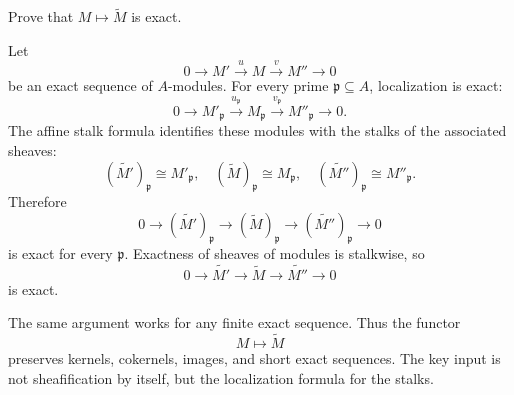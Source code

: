 \begin{problem}\label{prob:vi33-02}
Prove that \(M\mapsto\widetilde M\) is exact.
\end{problem}

\ifdefined\FullProblemDossiers
\begin{solution}
Let
\[
0\longrightarrow M'\xrightarrow{u}M\xrightarrow{v}M''\longrightarrow0
\]
be an exact sequence of \(A\)-modules.  For every prime \(\mathfrak p\subseteq A\), localization is exact:
\[
0\longrightarrow M'_{\mathfrak p}
\xrightarrow{u_{\mathfrak p}}
M_{\mathfrak p}
\xrightarrow{v_{\mathfrak p}}
M''_{\mathfrak p}
\longrightarrow0.
\]
The affine stalk formula identifies these modules with the stalks of the associated sheaves:
\[
(\widetilde{M'})_{\mathfrak p}\cong M'_{\mathfrak p},
\quad
(\widetilde M)_{\mathfrak p}\cong M_{\mathfrak p},
\quad
(\widetilde{M''})_{\mathfrak p}\cong M''_{\mathfrak p}.
\]
Therefore
\[
0\to(\widetilde{M'})_{\mathfrak p}
\to(\widetilde M)_{\mathfrak p}
\to(\widetilde{M''})_{\mathfrak p}
\to0
\]
is exact for every \(\mathfrak p\).  Exactness of sheaves of modules is stalkwise, so
\[
\boxed{
0\to\widetilde{M'}\to\widetilde M\to\widetilde{M''}\to0
}
\]
is exact.

The same argument works for any finite exact sequence. Thus the functor
\[
\boxed{M\longmapsto\widetilde M}
\]
preserves kernels, cokernels, images, and short exact sequences.  The key input is not sheafification by itself,
but the localization formula for the stalks.
\end{solution}
\fi
